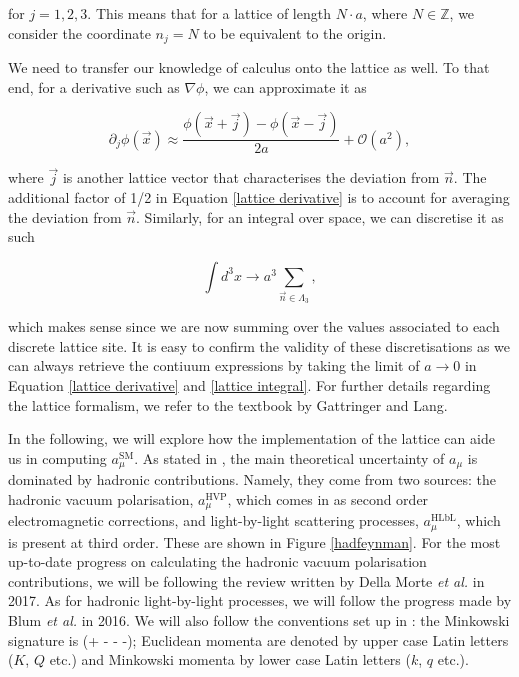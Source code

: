 \documentclass{article}
\numberwithin{equation}{section} %
\begin{document}
\noindent for $j=1,2,3$. This means that for a lattice of length $N\cdot a$, where $N\in\mathbb{Z}$, we consider the coordinate $n_j=N$ to be equivalent to the origin.

We need to transfer our knowledge of calculus onto the lattice as well. To that end, for a derivative such as $\nabla\phi$, we can approximate it as

\begin{equation}
\partial_j\phi(\vec{x}) \approx \frac{\phi(\vec{x}+\vec{j})-\phi(\vec{x}-\vec{j})}{2a} + \mathcal{O}(a^2),
\label{lattice derivative}
\end{equation}

\noindent where $\vec{j}$ is another lattice vector that characterises the deviation from $\vec{n}$. The additional factor of 1/2 in Equation \ref{lattice derivative} is to account for averaging the deviation from $\vec{n}$. Similarly, for an integral over space, we can discretise it as such

\begin{equation}
\int d^3x \rightarrow a^3\sum_{\vec{n}\in\Lambda_3},
\label{lattice integral}
\end{equation}

\noindent which makes sense since we are now summing over the values associated to each discrete lattice site. It is easy to confirm the validity of these discretisations as we can always retrieve the contiuum expressions by taking the limit of $a\rightarrow 0$ in Equation \ref{lattice derivative} and \ref{lattice integral}. For further details regarding the lattice formalism, we refer to the textbook by Gattringer and Lang\cite{lattice}.

In the following, we will explore how the implementation of the lattice can aide us in computing $a_\mu^\mathrm{SM}$. As stated in \cite{lehnerg2}, the main theoretical uncertainty of $a_\mu$ is dominated by hadronic contributions. Namely, they come from two sources: the hadronic vacuum polarisation, $a_\mu^\mathrm{HVP}$, which comes in as second order electromagnetic corrections, and light-by-light scattering  processes, $a_\mu^\mathrm{HLbL}$, which is present at third order. These are shown in Figure \ref{hadfeynman}. For the most up-to-date progress on calculating the hadronic vacuum polarisation contributions, we will be following the review written by Della Morte \textit{et al.}\cite{dellamorte} in 2017. As for hadronic light-by-light processes, we will follow the progress made by Blum \textit{et al.}\cite{blum} in 2016. We will also follow the conventions set up in \cite{vector}: the Minkowski signature is (+ - - -); Euclidean momenta are denoted by upper case Latin letters ($K$, $Q$ etc.) and Minkowski momenta by lower case Latin letters ($k$, $q$ etc.).
\end{document}
